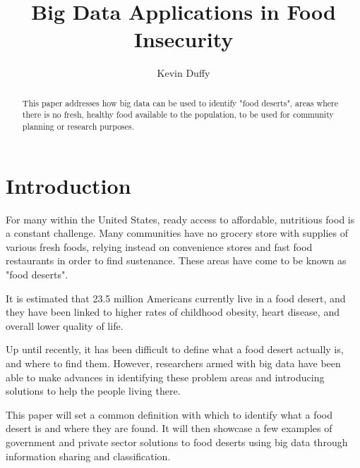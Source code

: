 \documentclass[sigconf]{acmart}
\begin{document}
\title{Big Data Applications in Food Insecurity}


\author{Kevin Duffy}




\renewcommand{\shortauthors}{K. Duffy}


\begin{abstract}
This paper addresses how big data can be used to identify "food deserts", areas where there is no fresh, healthy food available to the population, to be used for community planning or research purposes.
\end{abstract}



\maketitle

\section{Introduction}

For many within the United States, ready access to affordable, nutritious food is a constant challenge. Many communities have no grocery store with supplies of various fresh foods, relying instead on convenience stores and fast food restaurants in order to find sustenance. These areas have come to be known as "food deserts". 

It is estimated that 23.5 million Americans currently live in a food desert\cite{ver_ploeg_breneman_farrigan_2009}, and they have been linked to higher rates of childhood obesity, heart disease, and overall lower quality of life\cite{moore_roux_nettleton_jacobs_2008}. 

Up until recently, it has been difficult to define what a food desert actually is, and where to find them. However, researchers armed with big data have been able to make advances in identifying these problem areas and introducing solutions to help the people living there. 

This paper will set a common definition with which to identify what a food desert is and where they are found. It will then showcase a few examples of government and private sector solutions to food deserts using big data through information sharing and classification.
\end{document}
